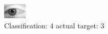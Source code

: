 \begin{figure}[h!]
\begin{center}
\includegraphics[width=0.60\columnwidth]{figures/ID2845_class_4_target_3.png}
\end{center}
\caption{ Classification: 4 actual target: 3}
\label{fig:ID2845_class_4_target_3}
\end{figure}
